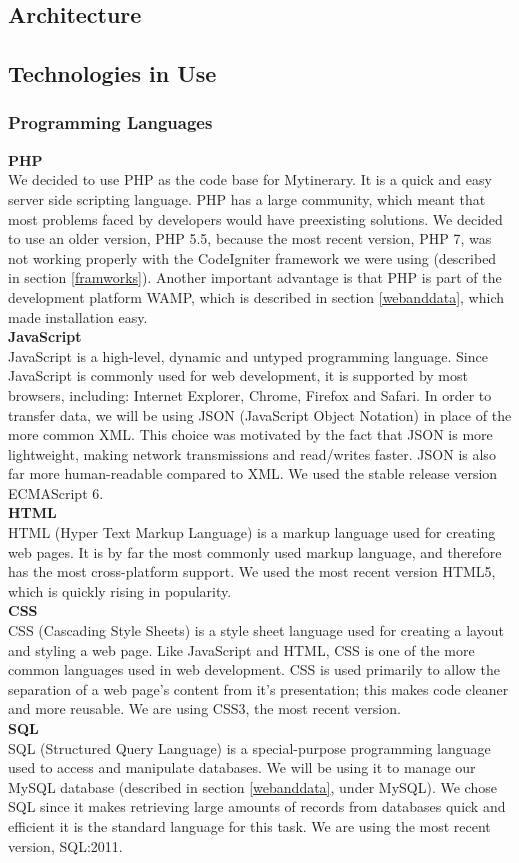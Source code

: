\documentclass[12pt]{article}
\begin{document}
\subsection{Architecture}


\subsection{Technologies in Use} \label{techInUse}
%
%
\subsubsection{Programming Languages} \label{languages}
\textbf{PHP}\\
We decided to use PHP as the code base for Mytinerary. It is a quick and easy server side scripting language. PHP has a large community, which meant that most problems faced by developers would have preexisting solutions. We decided to use an older version, PHP 5.5, because the most recent version, PHP 7, was not working properly with the CodeIgniter framework we were using (described in section \ref{framworks}). Another important advantage is that PHP is part of the development platform WAMP, which is described in section \ref{webanddata}, which made installation easy.
\\
%
\textbf{JavaScript}\\
JavaScript is a high-level, dynamic and untyped programming language. Since JavaScript is commonly used for web development, it is supported by most browsers, including: Internet Explorer, Chrome, Firefox and Safari. In order to transfer data, we will be using JSON (JavaScript Object Notation) in place of the more common XML. This choice was motivated by the fact that JSON is more lightweight, making network transmissions and read/writes faster. JSON is also far more human-readable compared to XML. We used the stable release version ECMAScript 6.\\
%
\textbf{HTML}\\
HTML (Hyper Text Markup Language) is a markup language used for creating web pages. It is by far the most commonly used markup language, and therefore has the most cross-platform support. We used the most recent version HTML5, which is quickly rising in popularity. 
\\
%
\textbf{CSS}\\
CSS (Cascading Style Sheets) is a style sheet language used for creating a layout and styling a web page. Like JavaScript and HTML, CSS is one of the more common languages used in web development. CSS is used primarily to allow the separation of a web page's content from it's presentation; this makes code cleaner and more reusable. We are using CSS3, the most recent version.
%
\\
\textbf{SQL}\\
SQL (Structured Query Language) is a special-purpose programming language used to access and manipulate databases. We will be using it to manage our MySQL database (described in section \ref{webanddata}, under MySQL). We chose SQL since it makes retrieving large amounts of records from databases quick and efficient it is the standard language for this task. We are using the most recent version, SQL:2011.
%
%
%
\end{document}
